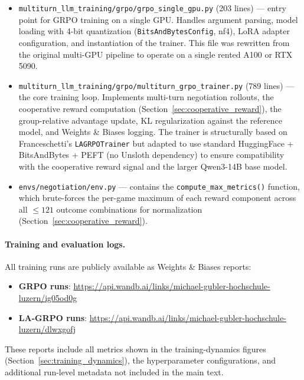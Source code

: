\documentclass[12pt,a4paper]{article}
\begin{document}
\begin{itemize}
    \item \texttt{multiturn\_llm\_training/grpo/grpo\_single\_gpu.py} (203 lines) --- entry point for GRPO training on a single GPU. Handles argument parsing, model loading with 4-bit quantization (\texttt{BitsAndBytesConfig}, nf4), LoRA adapter configuration, and instantiation of the trainer. This file was rewritten from the original multi-GPU pipeline to operate on a single rented A100 or RTX 5090.

    \item \texttt{multiturn\_llm\_training/grpo/multiturn\_grpo\_trainer.py} (789 lines) --- the core training loop. Implements multi-turn negotiation rollouts, the cooperative reward computation (Section~\ref{sec:cooperative_reward}), the group-relative advantage update, KL regularization against the reference model, and Weights \& Biases logging. The trainer is structurally based on Franceschetti's \texttt{LAGRPOTrainer} but adapted to use standard HuggingFace + BitsAndBytes + PEFT (no Unsloth dependency) to ensure compatibility with the cooperative reward signal and the larger Qwen3-14B base model.

    \item \texttt{envs/negotiation/env.py} --- contains the \texttt{compute\_max\_metrics()} function, which brute-forces the per-game maximum of each reward component across all $\leq 121$ outcome combinations for normalization (Section~\ref{sec:cooperative_reward}).
\end{itemize}

\paragraph{Training and evaluation logs.}
All training runs are publicly available as Weights \& Biases reports:
\begin{itemize}
    \item \textbf{GRPO runs}: \url{https://api.wandb.ai/links/michael-gubler-hochschule-luzern/ig05od0g}
    \item \textbf{LA-GRPO runs}: \url{https://api.wandb.ai/links/michael-gubler-hochschule-luzern/dlwxgofj}
\end{itemize}

These reports include all metrics shown in the training-dynamics figures (Section~\ref{sec:training_dynamics}), the hyperparameter configurations, and additional run-level metadata not included in the main text.
\end{document}
